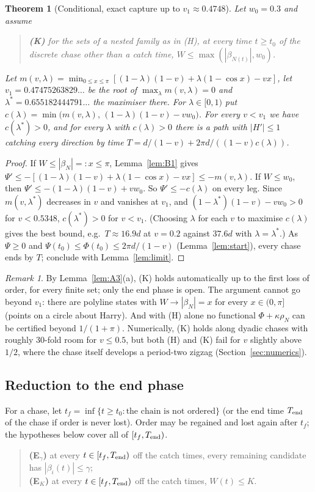 \documentclass[11pt]{article}
\newtheorem{theorem}{Theorem}
\theoremstyle{remark}\newtheorem{remark}{Remark}
\begin{document}
\begin{theorem}[Conditional, exact capture up to $v_1\approx0.4748$]\label{thm:B2}
Let $w_0=0.3$ and assume
\begin{quote}
\textbf{(K)} for the sets of a nested family as in (H), at every time $t\ge t_0$ of the discrete chase other than a catch time,
$W\le\max(|\beta_{N(t)}|,w_0)$.
\end{quote}
Let $m(v,\lambda)=\min_{0\le x\le\pi}[(1-\lambda)(1-v)+\lambda(1-\cos x)-vx]$, let $v_1=0.47475263829\ldots$ be the root of
$\max_\lambda m(v,\lambda)=0$ and $\lambda^*=0.655182444791\ldots$ the maximiser there. For $\lambda\in[0,1)$ put
$c(\lambda)=\min\bigl(m(v,\lambda),\,(1-\lambda)(1-v)-vw_0\bigr)$. For every $v<v_1$ we have $c(\lambda^*)>0$, and for every $\lambda$ with
$c(\lambda)>0$ there is a path with $|H'|\le1$ catching every direction by time $T=d/(1-v)+2\pi d/((1-v)c(\lambda))$.
\end{theorem}
\begin{proof}
If $W\le|\beta_N|=:x\le\pi$, Lemma~\ref{lem:B1} gives $\Psi'\le-[(1-\lambda)(1-v)+\lambda(1-\cos x)-vx]\le-m(v,\lambda)$. If $W\le w_0$, then
$\Psi'\le-(1-\lambda)(1-v)+vw_0$. So $\Psi'\le-c(\lambda)$ on every leg. Since $m(v,\lambda^*)$ decreases in $v$ and vanishes at $v_1$, and
$(1-\lambda^*)(1-v)-vw_0>0$ for $v<0.5348$, $c(\lambda^*)>0$ for $v<v_1$. (Choosing $\lambda$ for each $v$ to maximise $c(\lambda)$
gives the best bound, e.g.\ $T\approx16.9d$ at $v=0.2$ against $37.6d$ with $\lambda=\lambda^*$.) As $\Psi\ge0$ and $\Psi(t_0)\le\Phi(t_0)\le2\pi d/(1-v)$ (Lemma~\ref{lem:start}),
every chase ends by $T$; conclude with Lemma~\ref{lem:limit}.
\end{proof}
\begin{remark}
By Lemma~\ref{lem:A3}(a), (K) holds automatically up to the first loss of order, for every finite set; only the end phase is open.
The argument cannot go beyond $v_1$: there are polyline states with $W\to|\beta_N|=x$ for every $x\in(0,\pi]$ (points on a circle about
Harry). And with (H) alone no functional $\Phi+\kappa\rho_N$ can be certified beyond $1/(1+\pi)$. Numerically, (K) holds along dyadic
chases with roughly 30-fold room for $v\le0.5$, but both (H) and (K) fail for $v$ slightly above $1/2$, where the chase itself
develops a period-two zigzag (Section~\ref{sec:numerics}).
\end{remark}

\subsection*{Reduction to the end phase}
For a chase, let $t_f=\inf\{t\ge t_0:\text{the chain is not ordered}\}$ (or the end time $T_{\rm end}$ of the chase if order is never
lost). Order may be regained and lost again after $t_f$; the hypotheses below cover all of $[t_f,T_{\rm end})$.
\begin{quote}
\textbf{(E$_\gamma$)} at every $t\in[t_f,T_{\rm end})$ off the catch times, every remaining candidate has $|\beta_i(t)|\le\gamma$;\\
\textbf{(E$_K$)} at every $t\in[t_f,T_{\rm end})$ off the catch times, $W(t)\le K$.
\end{quote}
\end{document}
